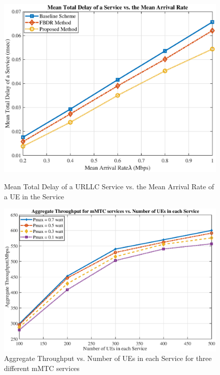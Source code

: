 \documentclass[lettersize,journal]{IEEEtran}
\begin{document}
\begin{figure}%
  \centering
  \captionsetup{justification=centering}
  \begin{minipage}[b]{0.4\textwidth}
    \includegraphics[scale = 0.3]{delay1_new.eps}
    \caption{Mean Total Delay of a URLLC Service vs. the Mean Arrival Rate of a UE in the Service}%
  \label{fig:7}
  \end{minipage}
  \qquad
  \begin{minipage}[b]{0.4\textwidth}
       \includegraphics[scale = 0.3]{AmmTCpower.eps}
  \caption{Aggregate Throughput vs. Number of UEs in each Service for three different mMTC services}
  \label{fig:8}
  \end{minipage}
\end{figure}
\end{document}

